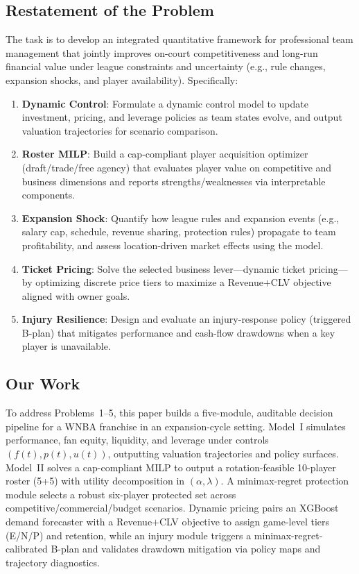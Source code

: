 \documentclass[12pt]{article}
\numberwithin{figure}{section}
\numberwithin{table}{section}
\begin{document}
	\subsection{Restatement of the Problem}
	The task is to develop an integrated quantitative framework for professional team management that jointly improves on-court competitiveness and long-run financial value under league constraints and uncertainty (e.g., rule changes, expansion shocks, and player availability). Specifically:
	\begin{enumerate}[itemsep=0.55em]
		\item \textbf{Dynamic Control}: Formulate a dynamic control model to update investment, pricing, and leverage policies as team states evolve, and output valuation trajectories for scenario comparison.
		
		\item \textbf{Roster MILP}: Build a cap-compliant player acquisition optimizer (draft/trade/free agency) that evaluates player value on competitive and business dimensions and reports strengths/weaknesses via interpretable components.
		
		\item \textbf{Expansion Shock}: Quantify how league rules and expansion events (e.g., salary cap, schedule, revenue sharing, protection rules) propagate to team profitability, and assess location-driven market effects using the model.
		
		\item \textbf{Ticket Pricing}: Solve the selected business lever---dynamic ticket pricing---by optimizing discrete price tiers to maximize a Revenue$+$CLV objective aligned with owner goals.
		
		\item \textbf{Injury Resilience}: Design and evaluate an injury-response policy (triggered B-plan) that mitigates performance and cash-flow drawdowns when a key player is unavailable.
	\end{enumerate}
	
	

	
	\subsection{Our Work}
	To address Problems~1--5, this paper builds a five-module, auditable decision pipeline for a WNBA franchise in an expansion-cycle setting.
	Model~I simulates performance, fan equity, liquidity, and leverage under controls $(f(t),p(t),u(t))$, outputting valuation trajectories and policy surfaces.
	Model~II solves a cap-compliant MILP to output a rotation-feasible 10-player roster (5+5) with utility decomposition in $(\alpha,\lambda)$.
	A minimax-regret protection module selects a robust six-player protected set across competitive/commercial/budget scenarios.
	Dynamic pricing pairs an XGBoost demand forecaster with a Revenue$+$CLV objective to assign game-level tiers (E/N/P) and retention, while an injury module triggers a minimax-regret-calibrated B-plan and validates drawdown mitigation via policy maps and trajectory diagnostics.
	
\end{document}

